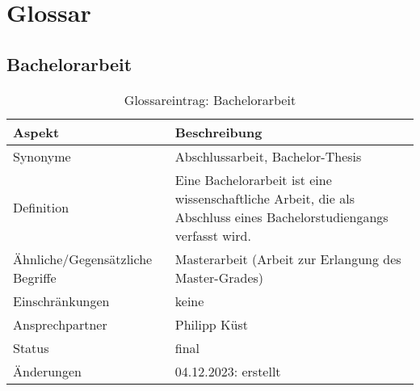 \chapter{Glossar}\label{ch:glossar}


\section*{Bachelorarbeit}\label{sec:glossar_bachelorarbeit}
\begin{table}[H]
    \label{tab:glossar_bachelorarbeit}
    \begin{tabularx}{\textwidth}{|l|X|}
        \hline
        \textbf{Aspekt}                  & \textbf{Beschreibung}                                                                                               \\
        \hline
        Synonyme                         & Abschlussarbeit, Bachelor-Thesis                                                                                    \\
        \hline
        Definition                       & Eine Bachelorarbeit ist eine wissenschaftliche Arbeit, die als Abschluss eines Bachelorstudiengangs verfasst wird. \\
        \hline
        Ähnliche/Gegensätzliche Begriffe & Masterarbeit (Arbeit zur Erlangung des Master-Grades)                                                                \\
        \hline
        Einschränkungen                  & keine                                                                                                               \\
        \hline
        Ansprechpartner                  & Philipp Küst                                                                                                        \\
        \hline
        Status                           & final                                                                                                               \\
        \hline
        Änderungen                       & 04.12.2023: erstellt                                                                                                \\
        \hline
    \end{tabularx}
    \caption{Glossareintrag: Bachelorarbeit}
\end{table}



